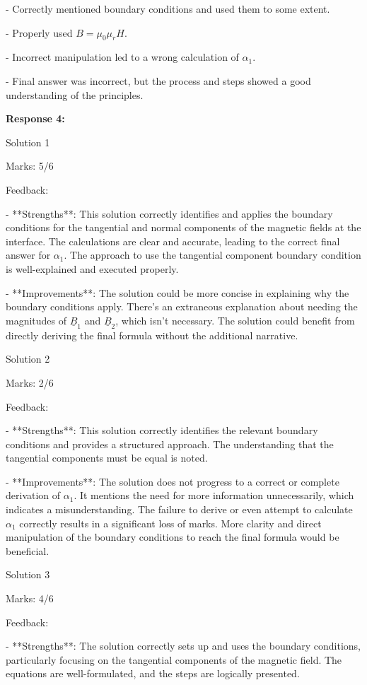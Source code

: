 \documentclass[a4paper,11pt]{article}
\begin{document}
- Correctly mentioned boundary conditions and used them to some extent.

- Properly used \( B = \mu_0 \mu_r H \).

- Incorrect manipulation led to a wrong calculation of \(\alpha_1\).

- Final answer was incorrect, but the process and steps showed a good understanding of the principles.

\bigskip
\textbf{Response 4:}

Solution 1

Marks: 5/6

Feedback:

- **Strengths**: This solution correctly identifies and applies the boundary conditions for the tangential and normal components of the magnetic fields at the interface. The calculations are clear and accurate, leading to the correct final answer for \(\alpha_1\). The approach to use the tangential component boundary condition is well-explained and executed properly.

- **Improvements**: The solution could be more concise in explaining why the boundary conditions apply. There's an extraneous explanation about needing the magnitudes of \( \underline{B}_1 \) and \( \underline{B}_2 \), which isn't necessary. The solution could benefit from directly deriving the final formula without the additional narrative.

Solution 2

Marks: 2/6

Feedback:

- **Strengths**: This solution correctly identifies the relevant boundary conditions and provides a structured approach. The understanding that the tangential components must be equal is noted.

- **Improvements**: The solution does not progress to a correct or complete derivation of \(\alpha_1\). It mentions the need for more information unnecessarily, which indicates a misunderstanding. The failure to derive or even attempt to calculate \(\alpha_1\) correctly results in a significant loss of marks. More clarity and direct manipulation of the boundary conditions to reach the final formula would be beneficial.

Solution 3

Marks: 4/6

Feedback:

- **Strengths**: The solution correctly sets up and uses the boundary conditions, particularly focusing on the tangential components of the magnetic field. The equations are well-formulated, and the steps are logically presented.
\end{document}
